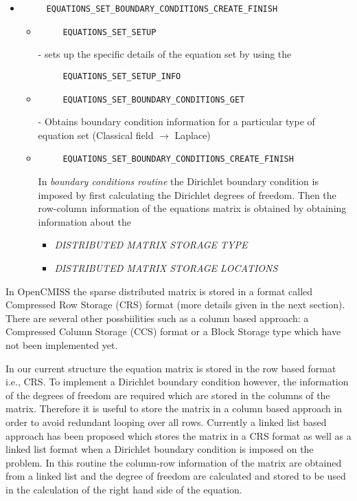 \begin{itemize}
\item \begin{verbatim}
     EQUATIONS_SET_BOUNDARY_CONDITIONS_CREATE_FINISH
    \end{verbatim} 
    \begin{itemize}
     \item  \begin{verbatim}
     EQUATIONS_SET_SETUP
    \end{verbatim} - sets up the specific details of the equation set by using the  \begin{verbatim}
     EQUATIONS_SET_SETUP_INFO
     \end{verbatim}
    \item  \begin{verbatim}
     EQUATIONS_SET_BOUNDARY_CONDITIONS_GET
    \end{verbatim} - Obtains boundary condition information for a particular type of equation set (Classical field $\rightarrow$ Laplace)
    \item \begin{verbatim}
     EQUATIONS_SET_BOUNDARY_CONDITIONS_CREATE_FINISH
    \end{verbatim} 
In \emph{boundary conditions routine}
 the Dirichlet boundary condition is imposed by first calculating the Dirichlet degrees of freedom. 
Then the row-column information of the equations matrix is obtained by obtaining information about the 
\begin{itemize}
 \item \emph{DISTRIBUTED MATRIX STORAGE TYPE}  
 \item \emph{DISTRIBUTED MATRIX STORAGE LOCATIONS}

\end{itemize}

\end{itemize}

\end{itemize}
 

 In OpenCMISS the sparse distributed matrix is stored in a format called Compressed Row Storage (CRS) format 
(more details given in the next section). There are several other possbiilities such as a column based approach: a Compressed Column Storage (CCS) format or a Block Storage type which have not been implemented yet. 

In our current structure the equation matrix is stored in the row based format i.e., CRS. 
To implement a Dirichlet boundary condition however, the information of the degrees of freedom are required which are stored in the columns of the matrix. 
Therefore it is useful to store the matrix in a column based approach in order to avoid redundant looping over all rows.
Currently a linked list based approach has been proposed which stores the matrix in a CRS format as well as a linked list format 
when a Dirichlet boundary condition is imposed on the problem. In this routine the column-row information of the matrix are obtained 
from a linked list and the degree of freedom are calculated and stored to be used in the calculation of the right 
hand side of the equation.




